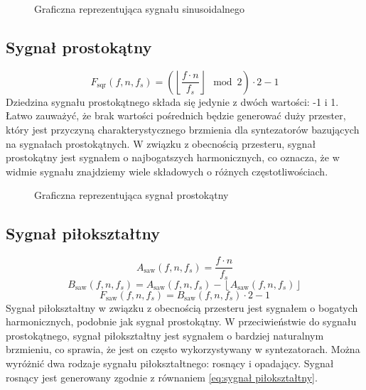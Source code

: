 \begin{figure}[H]
    \centering
    \scalebox{1.0}{}
    \caption{Graficzna reprezentująca sygnału sinusoidalnego}
    \label{fig:Graficzna reprezentująca sygnału sinusoidalego}
\end{figure}


\subsection{Sygnał prostokątny}
\newcommand{\Fsquare}{F_{\text{sqr}}}
\begin{equation}
    \Fsquare(f, n, f_s) = \left(\left\lfloor \frac{f \cdot n}{f_s} \right\rfloor \mod 2\right) \cdot 2 - 1
    \label{eq:sygnał prostokątny}
\end{equation}
\vspace{10pt}Dziedzina sygnału prostokątnego składa się jedynie z dwóch wartości: -1 i 1. Łatwo zauważyć, że brak wartości pośrednich będzie generować duży przester, który jest przyczyną charakterystycznego brzmienia dla syntezatorów bazujących na sygnałach prostokątnych. W związku z obecnością przesteru, sygnał prostokątny jest sygnałem o najbogatszych harmonicznych, co oznacza, że w widmie sygnału znajdziemy wiele składowych o różnych częstotliwościach.

\begin{figure}[H]
    \centering
    \scalebox{1.0}{}
    \caption{Graficzna reprezentująca sygnał prostokątny}
    \label{fig:Graficzna reprezentująca sygnał prostokątny}
\end{figure}


\subsection{Sygnał piłokształtny}
\newcommand{\Fsaw}{F_{\text{saw}}}
\newcommand{\Asaw}{A_{\text{saw}}}
\newcommand{\Bsaw}{B_{\text{saw}}}

\begin{equation}
    \Asaw(f, n, f_s) = \frac{f \cdot n}{f_s}
    \label{eq:sygnał piłokształtny a}
\end{equation}
\begin{equation}
    \Bsaw(f, n, f_s) = \Asaw(f, n, f_s) - \left\lfloor \Asaw(f, n, f_s) \right\rfloor
    \label{eq:sygnał piłokształtny b}
\end{equation}
\begin{equation}
    \Fsaw(f, n, f_s) = \Bsaw(f, n, f_s) \cdot 2 - 1
    \label{eq:sygnał piłokształtny}
\end{equation}
\vspace{10pt}Sygnał piłokształtny w związku z obecnością przesteru jest sygnałem o bogatych harmonicznych, podobnie jak sygnał prostokątny. W przeciwieństwie do sygnału prostokątnego, sygnał piłokształtny jest sygnałem o bardziej naturalnym brzmieniu, co sprawia, że jest on często wykorzystywany w syntezatorach. Można wyróżnić dwa rodzaje sygnału piłokształtnego: rosnący i opadający. Sygnał rosnący jest generowany zgodnie z równaniem \ref{eq:sygnał piłokształtny}.

